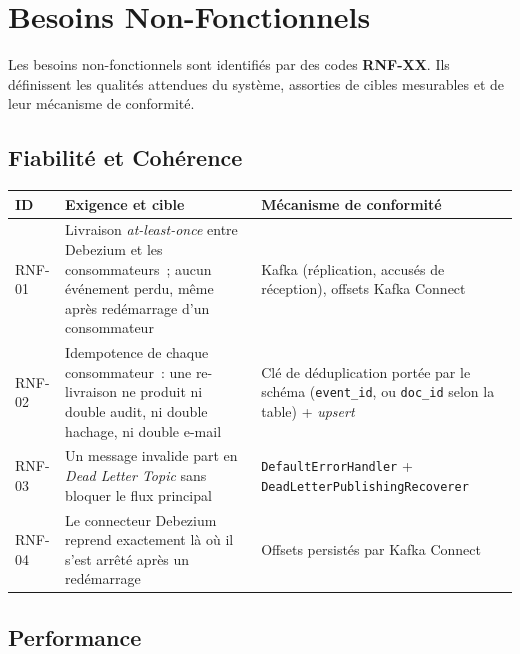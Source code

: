 \documentclass[12pt,a4paper,openany]{report}
\begin{document}
    \chapter{Besoins Non-Fonctionnels}

    Les besoins non-fonctionnels sont identifi\'es par des codes \textbf{RNF-XX}. Ils d\'efinissent les qualit\'es attendues du syst\`eme, assorties de cibles mesurables et de leur m\'ecanisme de conformit\'e.

    \section{Fiabilit\'e et Coh\'erence}
    \label{sec:fiabilite}

    \begin{longtable}{p{1.4cm}p{6.7cm}p{4cm}}
      \toprule
      \textbf{ID} & \textbf{Exigence et cible} & \textbf{M\'ecanisme de conformit\'e} \\
      \midrule
      \endhead
      \bottomrule
      \endfoot

      RNF-01 & Livraison \emph{at-least-once} entre Debezium et les consommateurs~; aucun \'ev\'enement perdu, m\^eme apr\`es red\'emarrage d'un consommateur & Kafka (r\'eplication, accus\'es de r\'eception), offsets Kafka Connect \\[4pt]
      RNF-02 & Idempotence de chaque consommateur~: une re-livraison ne produit ni double audit, ni double hachage, ni double e-mail & Cl\'e de d\'eduplication port\'ee par le sch\'ema (\texttt{event\_id}, ou \texttt{doc\_id} selon la table) + \emph{upsert} \\[4pt]
      RNF-03 & Un message invalide part en \emph{Dead Letter Topic} sans bloquer le flux principal & \texttt{DefaultErrorHandler} + \texttt{DeadLetterPublishingRecoverer} \\[4pt]
      RNF-04 & Le connecteur Debezium reprend exactement l\`a o\`u il s'est arr\^et\'e apr\`es un red\'emarrage & Offsets persist\'es par Kafka Connect \\
    \end{longtable}

    \section{Performance}
\end{document}
